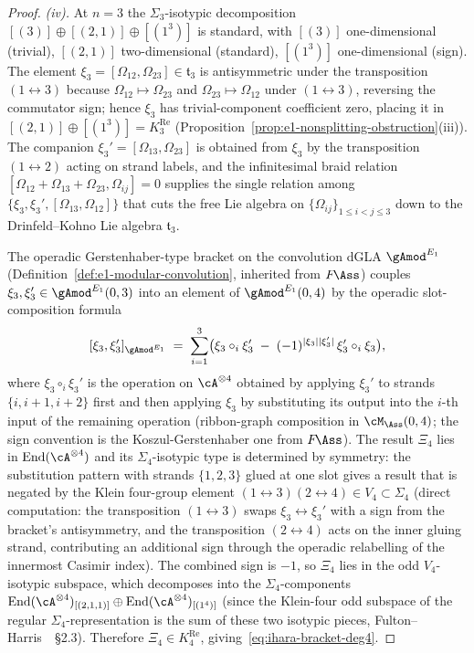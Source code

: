 \begin{proof}
\emph{(iv).} At $n=3$ the $\Sigma_3$-isotypic decomposition
$[(3)]\oplus[(2,1)]\oplus[(1^3)]$ is standard, with
$[(3)]$ one-dimensional (trivial), $[(2,1)]$ two-dimensional
(standard), $[(1^3)]$ one-dimensional (sign). The element
$\xi_3=[\Omega_{12},\Omega_{23}]\in\mathfrak{t}_3$ is antisymmetric
under the transposition $(1\leftrightarrow 3)$ because
$\Omega_{12}\mapsto\Omega_{23}$ and $\Omega_{23}\mapsto\Omega_{12}$
under $(1\leftrightarrow 3)$, reversing the commutator sign; hence
$\xi_3$ has trivial-component coefficient zero, placing it in
$[(2,1)]\oplus[(1^3)]=K^{\mathrm{Re}}_3$
(Proposition~\ref{prop:e1-nonsplitting-obstruction}(iii)). The
companion $\xi_3'=[\Omega_{13},\Omega_{23}]$ is obtained from $\xi_3$
by the transposition $(1\leftrightarrow 2)$ acting on strand labels,
and the infinitesimal braid relation
$[\Omega_{12}+\Omega_{13}+\Omega_{23},\Omega_{ij}]=0$ supplies the
single relation among $\{\xi_3,\xi_3',[\Omega_{13},\Omega_{12}]\}$
that cuts the free Lie algebra on $\{\Omega_{ij}\}_{1\leq i<j\leq 3}$
down to the Drinfeld--Kohno Lie algebra $\mathfrak{t}_3$.

The operadic Gerstenhaber-type bracket on the convolution dGLA
${\gAmod}^{E_1}$ (Definition~\ref{def:e1-modular-convolution},
inherited from $F\!\Ass$) couples $\xi_3,\xi_3'\in
{\gAmod}^{E_1}(0,3)$ into an element of ${\gAmod}^{E_1}(0,4)$ by
the operadic slot-composition formula
\[
 [\xi_3,\xi_3']_{{\gAmod}^{E_1}}
 \;=\;
 \sum_{i=1}^{3}
 \bigl(
 \xi_3\circ_i\xi_3'
 \;-\;
 (-1)^{|\xi_3||\xi_3'|}\,
 \xi_3'\circ_i\xi_3
 \bigr),
\]
where $\xi_3\circ_i\xi_3'$ is the operation on $\cA^{\otimes 4}$
obtained by applying $\xi_3'$ to strands
$\{i,i+1,i+2\}$ first and then applying $\xi_3$ by
substituting its output into the $i$-th input of the remaining
operation (ribbon-graph composition in $\cM_\Ass(0,4)$; the sign
convention is the Koszul-Gerstenhaber one from
$F\!\Ass$). The result $\Xi_4$ lies in
$\operatorname{End}(\cA^{\otimes 4})$ and its $\Sigma_4$-isotypic
type is determined by symmetry: the substitution pattern with
strands $\{1,2,3\}$ glued at one slot gives a result that is
negated by the Klein four-group element
$(1\leftrightarrow 3)(2\leftrightarrow 4)\in V_4\subset\Sigma_4$
(direct computation: the transposition $(1\leftrightarrow 3)$
swaps $\xi_3\leftrightarrow\xi_3'$ with a sign from the bracket's
antisymmetry, and the transposition $(2\leftrightarrow 4)$
acts on the inner gluing strand, contributing an additional sign
through the operadic relabelling of the innermost Casimir index).
The combined sign is $-1$, so $\Xi_4$ lies in the odd $V_4$-isotypic
subspace, which decomposes into the $\Sigma_4$-components
$\operatorname{End}(\cA^{\otimes 4})_{[(2,1,1)]}
\oplus\operatorname{End}(\cA^{\otimes 4})_{[(1^4)]}$ (since the
Klein-four odd subspace of the regular $\Sigma_4$-representation
is the sum of these two isotypic pieces,
Fulton--Harris~\textup{\cite{FH91}}~\S2.3). Therefore
$\Xi_4\in K^{\mathrm{Re}}_4$, giving~\eqref{eq:ihara-bracket-deg4}.


\end{proof}
